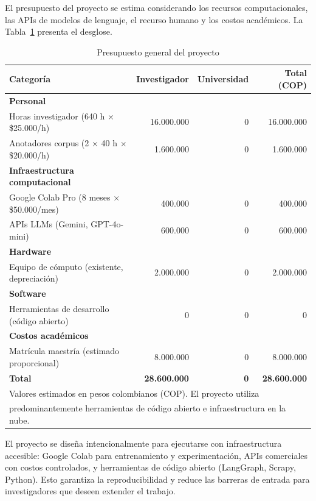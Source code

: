 El presupuesto del proyecto se estima considerando los recursos computacionales, las APIs de modelos de lenguaje, el recurso humano y los costos académicos. La Tabla~\ref{tab:presupuesto} presenta el desglose.

\begin{table}[htbp!]
	\centering
	\caption{Presupuesto general del proyecto}
    \footnotesize
    \begin{tabular}{| p{} | r | r | r |}
    	\rowcolor{AzulInstitucional} \textbf{\color{Blanco}Categoría} & \textbf{\color{Blanco}Investigador} & \textbf{\color{Blanco}Universidad} & \textbf{\color{Blanco}Total (COP)} \\
        \hline
        \hline
        \rowcolor{GrisNueve}\textbf{Personal} & & & \\
        \hline
        Horas investigador (640 h $\times$ \$25.000/h) & 16.000.000 & 0 & 16.000.000 \\
        \hline
        Anotadores corpus (2 $\times$ 40 h $\times$ \$20.000/h) & 1.600.000 & 0 & 1.600.000 \\
        \hline
        \hline
        \rowcolor{GrisNueve}\textbf{Infraestructura computacional} & & & \\
        \hline
        Google Colab Pro (8 meses $\times$ \$50.000/mes) & 400.000 & 0 & 400.000 \\
        \hline
        APIs LLMs (Gemini, GPT-4o-mini) & 600.000 & 0 & 600.000 \\
        \hline
        \hline
        \rowcolor{GrisNueve}\textbf{Hardware} & & & \\
        \hline
        Equipo de cómputo (existente, depreciación) & 2.000.000 & 0 & 2.000.000 \\
        \hline
        \hline
        \rowcolor{GrisNueve}\textbf{Software} & & & \\
        \hline
        Herramientas de desarrollo (código abierto) & 0 & 0 & 0 \\
        \hline
        \hline
        \rowcolor{GrisNueve}\textbf{Costos académicos} & & & \\
        \hline
        Matrícula maestría (estimado proporcional) & 8.000.000 & 0 & 8.000.000 \\
        \hline
        \hline
        \rowcolor{GrisOcho}\textbf{Total} & \textbf{28.600.000} & \textbf{0} & \textbf{28.600.000} \\
        \hline
        \multicolumn{4}{l}{\scriptsize Valores estimados en pesos colombianos (COP). El proyecto utiliza}\\
        \multicolumn{4}{l}{\scriptsize predominantemente herramientas de código abierto e infraestructura en la nube.}
	\end{tabular}
	\label{tab:presupuesto}
\end{table}

El proyecto se diseña intencionalmente para ejecutarse con infraestructura accesible: Google Colab para entrenamiento y experimentación, APIs comerciales con costos controlados, y herramientas de código abierto (LangGraph, Scrapy, Python). Esto garantiza la reproducibilidad y reduce las barreras de entrada para investigadores que deseen extender el trabajo.
